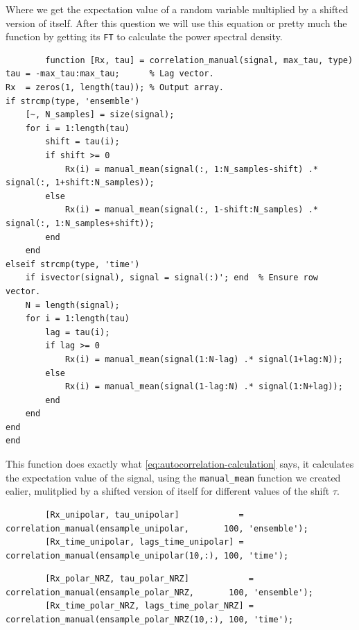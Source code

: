 Where we get the expectation value of a random variable multiplied by a shifted
version of itself. After this question we will use this equation or pretty much
the function by getting its \texttt{FT} to calculate the power spectral
density.

\begin{listing} [H]
    \caption{Autocorrelation Calculation Function}
    \label{listing:AutocorrelationCalculationFunction}
    \begin{verbatim}
        function [Rx, tau] = correlation_manual(signal, max_tau, type)
tau = -max_tau:max_tau;      % Lag vector.
Rx  = zeros(1, length(tau)); % Output array.
if strcmp(type, 'ensemble')
    [~, N_samples] = size(signal);
    for i = 1:length(tau)
        shift = tau(i);
        if shift >= 0
            Rx(i) = manual_mean(signal(:, 1:N_samples-shift) .* signal(:, 1+shift:N_samples));
        else
            Rx(i) = manual_mean(signal(:, 1-shift:N_samples) .* signal(:, 1:N_samples+shift));
        end
    end
elseif strcmp(type, 'time')
    if isvector(signal), signal = signal(:)'; end  % Ensure row vector.
    N = length(signal);
    for i = 1:length(tau)
        lag = tau(i);
        if lag >= 0
            Rx(i) = manual_mean(signal(1:N-lag) .* signal(1+lag:N));
        else
            Rx(i) = manual_mean(signal(1-lag:N) .* signal(1:N+lag));
        end
    end
end
end
    \end{verbatim}
\end{listing}

This function does exactly what \autoref{eq:autocorrelation-calculation} says,
it calculates the expectation value of the signal, using the
\texttt{manual\_mean} function we created ealier, mulitplied by a shifted
version of itself for different values of the shift $\tau$.

\begin{listing} [!htpb]
    \caption{Getting Autocorrelation for Unipolar}
    \label{Listing:UNIPOLARCORRELATION}
    \begin{verbatim}
        [Rx_unipolar, tau_unipolar]            = correlation_manual(ensample_unipolar,       100, 'ensemble');
        [Rx_time_unipolar, lags_time_unipolar] = correlation_manual(ensample_unipolar(10,:), 100, 'time');
    \end{verbatim}
\end{listing}

\begin{listing} [!htpb]
    \caption{Getting Autocorrelation for Polar NRZ}
    \label{Listing:POLARNRZCORRELATION}
    \begin{verbatim}
        [Rx_polar_NRZ, tau_polar_NRZ]            = correlation_manual(ensample_polar_NRZ,       100, 'ensemble');
        [Rx_time_polar_NRZ, lags_time_polar_NRZ] = correlation_manual(ensample_polar_NRZ(10,:), 100, 'time');
    \end{verbatim}
\end{listing}

